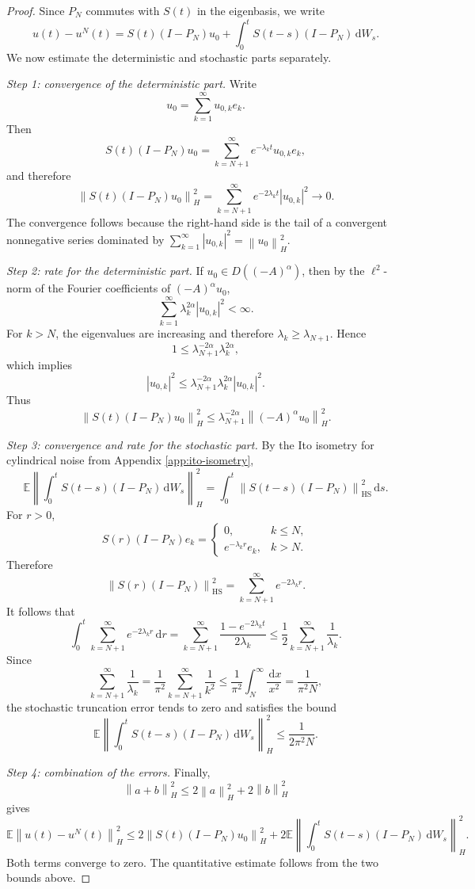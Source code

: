 \documentclass[11pt,a4paper]{article}
\newcommand{\E}{\mathbb{E}}
\newcommand{\dd}{\,\mathrm{d}}
\newcommand{\HS}{\mathrm{HS}}
\newcommand{\norm}[1]{\left\lVert #1 \right\rVert}
\newcommand{\dom}{D}
\begin{document}
\begin{proof}
Since \(P_N\) commutes with \(S(t)\) in the eigenbasis, we write
\[
  u(t)-u^N(t)
  =
  S(t)(I-P_N)u_0
  +
  \int_0^t S(t-s)(I-P_N)\dd W_s.
\]
We now estimate the deterministic and stochastic parts separately.

\emph{Step 1: convergence of the deterministic part.}
Write
\[
  u_0=\sum_{k=1}^{\infty}u_{0,k}e_k.
\]
Then
\[
  S(t)(I-P_N)u_0
  =
  \sum_{k=N+1}^{\infty}e^{-\lambda_k t}u_{0,k}e_k,
\]
and therefore
\[
  \norm{S(t)(I-P_N)u_0}_H^2
  =
  \sum_{k=N+1}^{\infty}e^{-2\lambda_k t}|u_{0,k}|^2
  \longrightarrow0.
\]
The convergence follows because the right-hand side is the tail of a
convergent nonnegative series dominated by
\(\sum_{k=1}^{\infty}|u_{0,k}|^2=\norm{u_0}_H^2\).

\emph{Step 2: rate for the deterministic part.}
If \(u_0\in\dom((-A)^\alpha)\), then by the \(\ell^2\)-norm of the Fourier
coefficients of \((-A)^\alpha u_0\),
\[
  \sum_{k=1}^{\infty}\lambda_k^{2\alpha}|u_{0,k}|^2<\infty.
\]
For \(k>N\), the eigenvalues are increasing and therefore
\(\lambda_k\ge\lambda_{N+1}\). Hence
\[
  1\le \lambda_{N+1}^{-2\alpha}\lambda_k^{2\alpha},
\]
which implies
\[
  |u_{0,k}|^2
  \le
  \lambda_{N+1}^{-2\alpha}\lambda_k^{2\alpha}|u_{0,k}|^2.
\]
Thus
\[
  \norm{S(t)(I-P_N)u_0}_H^2
  \le
  \lambda_{N+1}^{-2\alpha}
  \norm{(-A)^\alpha u_0}_H^2.
\]

\emph{Step 3: convergence and rate for the stochastic part.}
By the Ito isometry for cylindrical noise from Appendix
\ref{app:ito-isometry},
\[
  \E\left\|
    \int_0^t S(t-s)(I-P_N)\dd W_s
  \right\|_H^2
  =
  \int_0^t
  \norm{S(t-s)(I-P_N)}_{\HS}^2\dd s.
\]
For \(r>0\),
\[
  S(r)(I-P_N)e_k
  =
  \begin{cases}
    0, & k\le N,\\
    e^{-\lambda_k r}e_k, & k>N.
  \end{cases}
\]
Therefore
\[
  \norm{S(r)(I-P_N)}_{\HS}^2
  =
  \sum_{k=N+1}^{\infty}e^{-2\lambda_k r}.
\]
It follows that
\[
  \int_0^t
  \sum_{k=N+1}^{\infty}e^{-2\lambda_k r}\dd r
  =
  \sum_{k=N+1}^{\infty}
  \frac{1-e^{-2\lambda_k t}}{2\lambda_k}
  \le
  \frac12\sum_{k=N+1}^{\infty}\frac1{\lambda_k}.
\]
Since
\[
  \sum_{k=N+1}^{\infty}\frac1{\lambda_k}
  =
  \frac1{\pi^2}\sum_{k=N+1}^{\infty}\frac1{k^2}
  \le
  \frac1{\pi^2}\int_N^\infty \frac{\dd x}{x^2}
  =
  \frac1{\pi^2N},
\]
the stochastic truncation error tends to zero and satisfies the bound
\[
  \E\left\|
    \int_0^t S(t-s)(I-P_N)\dd W_s
  \right\|_H^2
  \le \frac{1}{2\pi^2N}.
\]

\emph{Step 4: combination of the errors.}
Finally,
\[
  \norm{a+b}_H^2\le2\norm{a}_H^2+2\norm{b}_H^2
\]
gives
\[
  \E\norm{u(t)-u^N(t)}_H^2
  \le
  2\norm{S(t)(I-P_N)u_0}_H^2
  +
  2\E\left\|
    \int_0^t S(t-s)(I-P_N)\dd W_s
  \right\|_H^2.
\]
Both terms converge to zero. The quantitative estimate follows from the two
bounds above.
\end{proof}
\end{document}
